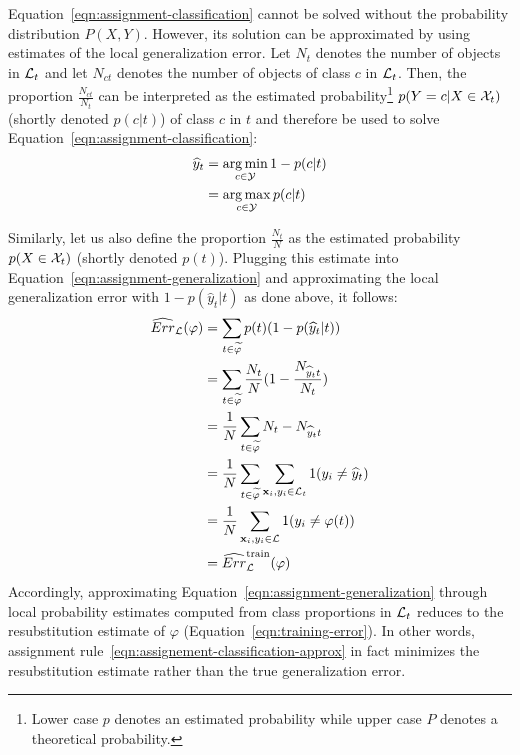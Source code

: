 Equation~\ref{eqn:assignment-classification} cannot be solved
without the probability distribution $P(X, Y)$. However, its solution can be
approximated by using estimates of the local generalization error. Let $N_t$ denotes
the number of objects in ${\cal L}_t$ and let $N_{ct}$ denotes the number of
objects of class $c$ in ${\cal L}_t$. Then, the proportion
$\tfrac{N_{ct}}{N_t}$ can be interpreted as the estimated probability\footnote{Lower case $p$ denotes an estimated probability while upper case $P$ denotes a theoretical probability.}
$p(Y=c|X\in{\cal X}_t)$ (shortly denoted $p(c|t)$) of class $c$ in $t$ and therefore be used to solve
Equation~\ref{eqn:assignment-classification}:
\begin{align}\label{eqn:assignement-classification-approx}
\widehat{y}_t &= \operatorname*{arg\,min}_{c \in {\cal Y}} 1 - p(c | t) \nonumber \\
              &= \operatorname*{arg\,max}_{c \in {\cal Y}} p(c | t)
\end{align}

Similarly, let us also define the proportion $\tfrac{N_t}{N}$ as the estimated
probability $p(X \in {\cal X}_t)$ (shortly denoted $p(t)$). Plugging this
estimate into Equation~\ref{eqn:assignment-generalization} and approximating
the local generalization error with $1 - p(\widehat{y}_t | t)$ as done above, it follows:
\begin{align}
\widehat{Err}_{\cal L}(\varphi) &= \sum_{t \in \widetilde{\varphi}} p(t) (1 - p(\widehat{y}_t | t)) \nonumber \\
    &= \sum_{t \in \widetilde{\varphi}} \frac{N_t}{N} (1 - \frac{N_{{\widehat{y}_t}t}}{N_t}) \nonumber \\
    &= \frac{1}{N} \sum_{t \in \widetilde{\varphi}} N_t - N_{{\widehat{y}_t}t} \nonumber \\
    &= \frac{1}{N} \sum_{t \in \widetilde{\varphi}} \sum_{\mathbf{x}_i, y_i \in {\cal L}_t} 1(y_i \neq \widehat{y}_t) \nonumber \\
    &= \frac{1}{N} \sum_{\mathbf{x}_i, y_i \in {\cal L}} 1(y_i \neq \varphi(t)) \nonumber \\
    &= \widehat{Err}_{\cal L}^\text{train}(\varphi) \label{eqn:train-error-tree}
\end{align}
Accordingly, approximating Equation~\ref{eqn:assignment-generalization}
through local probability estimates computed from class proportions in
${\cal L}_t$ reduces to the resubstitution estimate of $\varphi$
(Equation~\ref{eqn:training-error}). In other words, assignment
rule~\ref{eqn:assignement-classification-approx} in fact minimizes the
resubstitution estimate rather than the true
generalization error.

